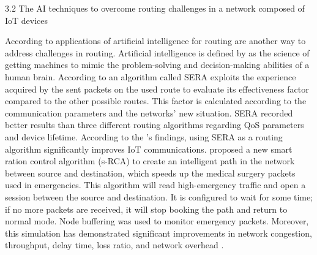   3.2 The AI techniques to overcome routing challenges in a network composed of IoT devices 
  
According to \cite{Tlili-Sihem-Mnasri-Sami-Val-hierry:2022} applications of artificial intelligence for routing are another 
way to address challenges in routing. Artificial intelligence is defined by \cite{Dick-Stephanie:2019}
as the science of getting machines to mimic the problem-solving and decision-making abilities of a human brain. 
According to \cite{amrioui-Sofiane-Hamrioui-Camil-Lloret-Jaime-Lorenz-Pascal:2018} an algorithm called SERA exploits 
the experience acquired by the sent packets on the used route to evaluate its effectiveness factor compared to the other 
possible routes. This factor is calculated according to the communication parameters and the networks’ new situation. 
SERA recorded better results than three different routing algorithms regarding QoS parameters and device lifetime.
According to the \cite{amrioui-Sofiane-Hamrioui-Camil-Lloret-Jaime-Lorenz-Pascal:2018}'s findings, using SERA as a routing 
algorithm significantly improves IoT communications. \cite{bujassar-Radwan-Yaseen-Husam-Al-Adwan-Ahmad:2021} proposed a new smart 
ration control algorithm (s-RCA) to create an intelligent path in the network between source and destination, which speeds 
up the medical surgery packets used in emergencies. This algorithm will read high-emergency traffic and open a session between
 the source and destination. It is configured to wait for some time; if no more packets are received, it will stop booking the 
 path and return to normal mode. Node buffering was used to monitor emergency packets. Moreover, this simulation has demonstrated 
 significant improvements in network congestion, throughput, delay time, loss ratio, and network overhead 
 \cite{bujassar-Radwan-Yaseen-Husam-Al-Adwan-Ahmad:2021}. 


